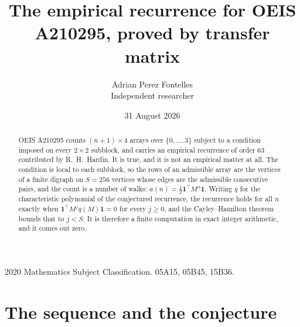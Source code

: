 \documentclass[11pt,a4paper]{article}
\title{The empirical recurrence for OEIS A210295, proved by transfer matrix}
\author{Adrian Perez Fontelles\\ \small Independent researcher}
\date{31 August 2026}
\theoremstyle{plain}
\theoremstyle{definition}
\begin{document}
\maketitle

\begin{abstract}
OEIS A210295 counts $(n+1)\times4$ arrays over $\{0,\dots,3\}$ subject to a condition imposed on
every $2\times2$ subblock, and carries an empirical recurrence of order $63$ contributed
by R.~H.~Hardin. It is true, and it is not an empirical matter at all. The condition is local
to each subblock, so the rows of an admissible array are the vertices of a finite digraph
on $S=256$ vertices whose edges are the admissible consecutive pairs, and the count is a
number of walks: $a(n)=\tfrac1{2}\mathbf{1}^{\!\top}M^{n}\mathbf{1}$. Writing $q$
for the characteristic polynomial of the conjectured recurrence, the recurrence holds for all
$n$ exactly when $\mathbf{1}^{\!\top}M^{j}q(M)\mathbf{1}=0$ for every $j\ge0$, and the
Cayley--Hamilton theorem bounds that to $j<S$. It is therefore a finite computation in exact
integer arithmetic, and it comes out zero.
\end{abstract}

\noindent\small 2020 Mathematics Subject Classification. 05A15, 05B45, 15B36.\normalsize

\section{The sequence and the conjecture}
\end{document}
